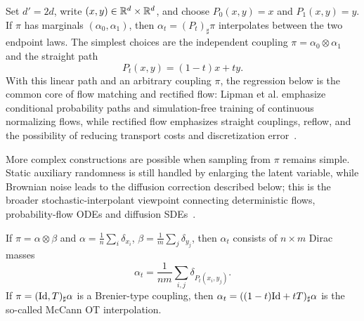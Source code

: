 \begin{example}
	Set $d'=2d$, write $(x,y)\in\mathbb{R}^d\times\mathbb{R}^d$, and choose $P_0(x,y)=x$ and $P_1(x,y)=y$. If $\pi$ has marginals $(\alpha_0,\alpha_1)$, then $\alpha_t=(P_t)_\sharp\pi$ interpolates between the two endpoint laws. The simplest choices are the independent coupling $\pi=\alpha_0\otimes\alpha_1$ and the straight path
	\[
		P_t(x,y)=(1-t)x+ty.
	\]
	With this linear path and an arbitrary coupling $\pi$, the regression below is the common core of flow matching and rectified flow: Lipman et al. emphasize conditional probability paths and simulation-free training of continuous normalizing flows, while rectified flow emphasizes straight couplings, reflow, and the possibility of reducing transport costs and discretization error~\cite{Lipman2022FlowMatching,Liu2023RectifiedFlow}.

	More complex constructions are possible when sampling from $\pi$ remains simple. Static auxiliary randomness is still handled by enlarging the latent variable, while Brownian noise leads to the diffusion correction described below; this is the broader stochastic-interpolant viewpoint connecting deterministic flows, probability-flow ODEs and diffusion SDEs~\cite{Albergo2025StochasticInterpolants}.
\end{example}

If $\pi = \alpha \otimes \beta$ and $\alpha = \frac{1}{n} \sum_i \delta_{x_i}$, $\beta = \frac{1}{m} \sum_j \delta_{y_j}$, then $\alpha_t$ consists of $n \times m$ Dirac masses
\begin{equation*}
    \alpha_t = \frac{1}{nm} \sum_{i,j} \delta_{P_t(x_i,y_j)}.
\end{equation*}
If $\pi = (\mathrm{Id}, T)_\sharp \alpha$ is a Brenier-type coupling, then $\alpha_t = ((1-t)\mathrm{Id} + tT)_\sharp \alpha$ is the so-called McCann OT interpolation.

